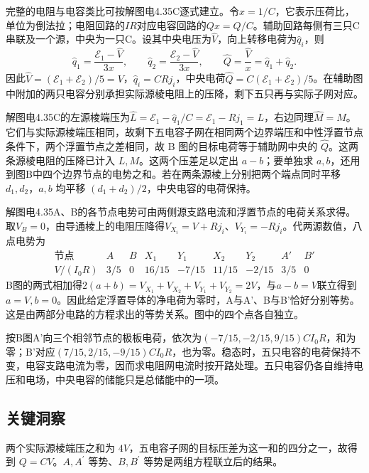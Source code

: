 \documentclass[UTF8,fontset=fandol,a4paper,11pt]{ctexart}
\begin{document}
完整的电阻与电容类比可按解图电4.35C逐式建立。令$x=1/C$，它表示压荷比，单位为倒法拉；电阻回路的$IR$对应电容回路的$Qx=Q/C$。辅助回路每侧有三只C串联及一个源，中央为一只C。设其中央电压为$\widehat V$，向上转移电荷为$\widehat q_i$，则
\[
\widehat q_1=\frac{\mathcal E_1-\widehat V}{3x},\qquad
\widehat q_2=\frac{\mathcal E_2-\widehat V}{3x},\qquad
\widehat Q=\frac{\widehat V}{x}=\widehat q_1+\widehat q_2.
\]
因此$\widehat V=(\mathcal E_1+\mathcal E_2)/5=V$，$\widehat q_i=CRj_i$，中央电荷$\widehat Q=C(\mathcal E_1+\mathcal E_2)/5$。在辅助图中附加的两只电容分别承担实际源棱电阻上的压降，剩下五只再与实际子网对应。

解图电4.35C的左源棱端压为$\widehat L=\mathcal E_1-\widehat q_1/C=\mathcal E_1-Rj_1=L$，右边同理$\widehat M=M$。它们与实际源棱端压相同，故剩下五电容子网在相同两个边界端压和中性浮置节点条件下，两个浮置节点之差相同，故 B 图的目标电荷等于辅助网中央的 $\widehat Q$。这两条源棱电阻的压降已计入 $L,M$。这两个压差足以定出 $a-b$；要单独求 $a,b$，还用到图B中四个边界节点的电势之和。若在两条源棱上分别把两个端点同时平移 $d_1,d_2$，$a,b$ 均平移 $(d_1+d_2)/2$，中央电容的电荷保持。

解图电4.35A、B的各节点电势可由两侧源支路电流和浮置节点的电荷关系求得。取$V_B=0$，由导通棱上的电阻压降得$V_{X_i}=V+Rj_i$、$V_{Y_i}=-Rj_i$。代两源数值，八点电势为
\[
\begin{array}{c|rrrrrrrr}
\text{节点}&A&B&X_1&Y_1&X_2&Y_2&A'&B'\\\hline
V/(I_0R)&3/5&0&16/15&-7/15&11/15&-2/15&3/5&0
\end{array}
\]
B图的两式相加得$2(a+b)=V_{X_1}+V_{X_2}+V_{Y_1}+V_{Y_2}=2V$，与$a-b=V$联立得到$a=V,b=0$。因此给定浮置导体的净电荷为零时，A与A'、B与B'恰好分别等势。这是由两部分电路的方程求出的等势关系。图中的四个点各自独立。

按B图A'向三个相邻节点的极板电荷，依次为$(-7/15,-2/15,9/15)CI_0R$，和为零；B'对应$(7/15,2/15,-9/15)CI_0R$，也为零。稳态时，五只电容的电荷保持不变，电容支路电流为零，因而求电阻网电流时按开路处理。五只电容仍各自维持电压和电场，中央电容的储能只是总储能中的一项。




\subsection*{关键洞察}

两个实际源棱端压之和为 $4V$，五电容子网的目标压差为这一和的四分之一，故得到 $Q=CV$。$A,A^\prime$ 等势、$B,B^\prime$ 等势是两组方程联立后的结果。
\end{document}
